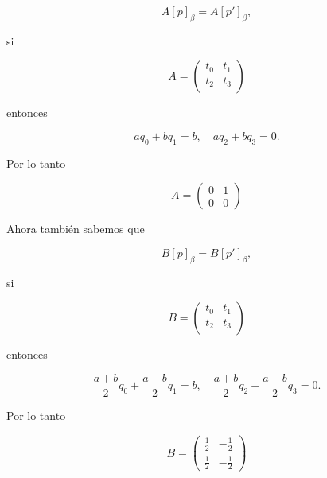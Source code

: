 \documentclass[letterpaper]{article}
\theoremstyle{definition}
\theoremstyle{lemathm}
\theoremstyle{lemademthm}
\begin{document}
\begin{enumerate}
\begin{enumerate}
			\[A[p]_\beta = A[p']_\beta,\]
		
			si 
		
			\[A = \begin{pmatrix}
				t_0 & t_1\\
				t_2 & t_3\\
			\end{pmatrix}\]
		
			entonces
		
			\[aq_0 + bq_1 = b, \quad aq_2 + bq_3 = 0.\]
		
			Por lo tanto
		
			\[A = \begin{pmatrix}
				0 & 1\\
				0 & 0
			\end{pmatrix}\]
		
			Ahora también sabemos que
		
			\[B[p]_\beta = B[p']_\beta,\]
		
			si 
		
			\[B = \begin{pmatrix}
				t_0 & t_1\\
				t_2 & t_3\\
			\end{pmatrix}\]
		
			entonces
		
			\[\frac{a+b}{2}q_0 + \frac{a-b}{2}q_1 = b, \quad \frac{a+b}{2}q_2 + \frac{a-b}{2}q_3 = 0.\]
		
			Por lo tanto
		
			\[B = \begin{pmatrix}
				\frac{1}{2} & -\frac{1}{2}\\
				\frac{1}{2} & -\frac{1}{2}
			\end{pmatrix}\]
		
		\end{enumerate}

	\end{enumerate}
	
\end{document}
